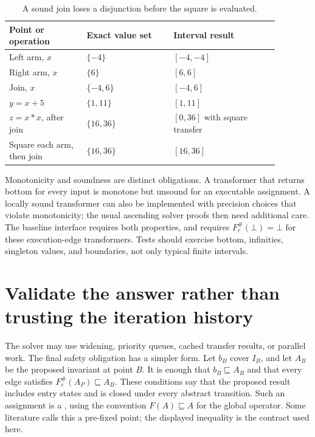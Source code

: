 \begin{table}
\centering
\caption{A sound join loses a disjunction before the square is evaluated.}
\label{tab:ch42-join-loss}
\begin{tabular}{p{0.25\linewidth}p{0.29\linewidth}p{0.34\linewidth}}
\toprule
Point or operation & Exact value set & Interval result \\
\midrule
Left arm, $x$ & $\{-4\}$ & $[-4,-4]$ \\
Right arm, $x$ & $\{6\}$ & $[6,6]$ \\
Join, $x$ & $\{-4,6\}$ & $[-4,6]$ \\
$y=x+5$ & $\{1,11\}$ & $[1,11]$ \\
$z=x*x$, after join & $\{16,36\}$ & $[0,36]$ with square transfer \\
Square each arm, then join & $\{16,36\}$ & $[16,36]$ \\
\bottomrule
\end{tabular}
\end{table}

Monotonicity and soundness are distinct obligations.
A transformer that returns bottom for every input is monotone but unsound for an executable assignment.
A locally sound transformer can also be implemented with precision choices that violate monotonicity; the usual ascending solver proofs then need additional care.
The baseline interface requires both properties, and requires $F_e^\#(\bot)=\bot$ for these execution-edge transformers.
Tests should exercise bottom, infinities, singleton values, and boundaries, not only typical finite intervals.

\section{Validate the answer rather than trusting the iteration history}
\label{sec:ch42-certificates}

The solver may use widening, priority queues, cached transfer results, or parallel work.
The final safety obligation has a simpler form.
Let $b_B$ cover $I_B$, and let $A_B$ be the proposed invariant at point $B$.
It is enough that $b_B\sqsubseteq A_B$ and that every edge satisfies $F_e^\#(A_P)\sqsubseteq A_B$.
These conditions say that the proposed result includes entry states and is closed under every abstract transition.
Such an assignment is a , using the convention $F(A)\sqsubseteq A$ for the global operator.
Some literature calls this a pre-fixed point; the displayed inequality is the contract used here.

